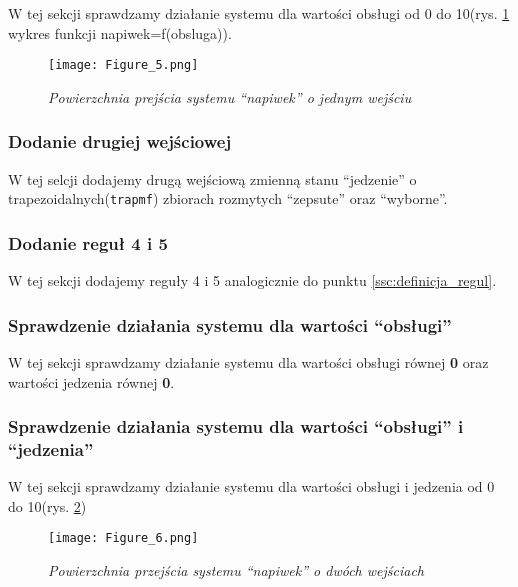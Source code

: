 W tej sekcji sprawdzamy działanie systemu dla wartości obsługi od 0 do 10(rys. \ref{fig:napiwek_obsluga} wykres funkcji napiwek=f(obsluga)).



\begin{figure}[H]
	\centering
	\texttt{[image: Figure\_5.png]}
	\caption{\textit{Powierzchnia prejścia systemu ``napiwek'' o jednym wejściu}}
	\label{fig:napiwek_obsluga}
\end{figure}

\subsubsection{Dodanie drugiej wejściowej}\label{ssc:dodanie_wejsciowej}
 
W tej selcji dodajemy drugą wejściową zmienną stanu ``jedzenie'' o trapezoidalnych(\verb|trapmf|) zbiorach rozmytych ``zepsute'' oraz ``wyborne''.




\subsubsection{Dodanie reguł 4 i 5}\label{ssc:dodanie_regul45}

W tej sekcji dodajemy reguły 4 i 5 analogicznie do punktu \ref{ssc:definicja_regul}.



\subsubsection{Sprawdzenie działania systemu dla wartości ``obsługi''}\label{ssc:sprawdzenie_dzialania_wartosc_obsluga}

W tej sekcji sprawdzamy działanie systemu dla wartości obsługi równej \textbf{0} oraz wartości jedzenia równej \textbf{0}.



\subsubsection{Sprawdzenie działania systemu dla wartości ``obsługi'' i ``jedzenia''}\label{ssc:sprawdzenie_dzialania_obsluga_jedzenie}

W tej sekcji sprawdzamy działanie systemu dla wartości obsługi i jedzenia od 0 do 10(rys. \ref{fig:napiwek_obsluga_jedzenie})



\begin{figure}[H]
	\centering
	\texttt{[image: Figure\_6.png]}
	\caption{\textit{Powierzchnia przejścia systemu ``napiwek'' o dwóch wejściach}}
	\label{fig:napiwek_obsluga_jedzenie}
\end{figure}
